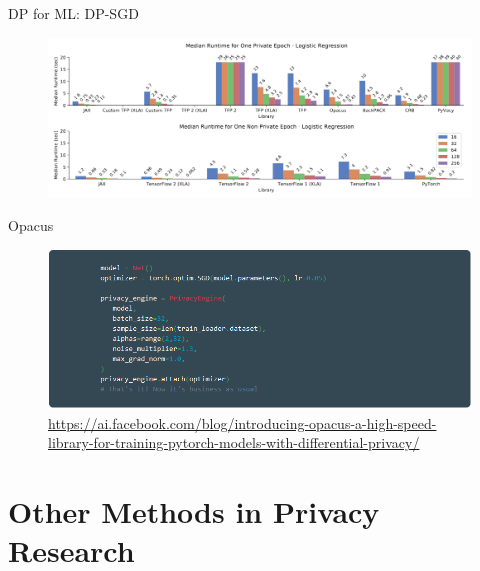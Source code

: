 \documentclass[12pt,aspectratio=169]{beamer}
\begin{document}
\begin{frame}{DP for ML: DP-SGD}

\begin{figure}
    \centering
    \includegraphics[width=1.1\linewidth]{figures/dp-sgd-speeds.PNG}
    \caption{\citet{subramani2021enabling}}
\end{figure}

\end{frame}

\begin{frame}{Opacus}

\begin{figure}
    \centering
    \includegraphics[width=1.15\linewidth]{figures/Opacus.PNG}
    \caption{\tiny \url{https://ai.facebook.com/blog/introducing-opacus-a-high-speed-library-for-training-pytorch-models-with-differential-privacy/}}
\end{figure}

\end{frame}

\section{Other Methods in Privacy Research}
\end{document}
